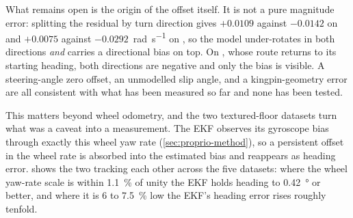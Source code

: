 What remains open is the origin of the offset itself. It is not a pure magnitude
error: splitting the residual by turn direction gives $+0.0109$ against $-0.0142$
on  and $+0.0075$ against
$-0.0292$~\si{\radian\per\second} on , so the model
under-rotates in both directions \emph{and} carries a directional bias on top. On
, whose route returns to its starting heading, both directions
are negative and only the bias is visible. A steering-angle zero offset, an
unmodelled slip angle, and a kingpin-geometry error are all consistent with what
has been measured so far and none has been tested.

This matters beyond wheel odometry, and the two textured-floor datasets turn what
was a caveat into a measurement. The EKF observes its gyroscope bias through
exactly this wheel yaw rate (\cref{sec:proprio-method}), so a persistent offset in
the wheel rate is absorbed into the estimated bias and reappears as heading error.
 shows the two tracking each other across the five
datasets: where the wheel yaw-rate scale is within \SI{1.1}{\percent} of unity the
EKF holds heading to \SI{0.42}{\degree} or better, and where it is \SI{6}{} to
\SI{7.5}{\percent} low the EKF's heading error rises roughly tenfold.

\begin{table}[htbp]
\centering
\caption{The EKF's heading error follows the quality of the wheel yaw rate it uses
to observe its gyroscope bias. The filter is no better than its rate reference,
which is the cost of making the bias observable at all.}
\label{tab:ekf-coupling}
\small
{}
\end{table}

